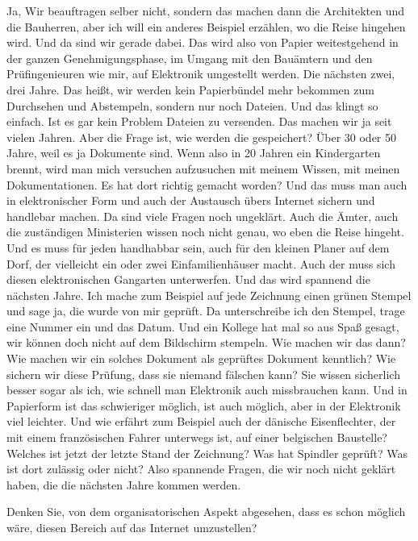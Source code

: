 \begin{description}
\Andre Ja, Wir beauftragen selber nicht, sondern das machen dann die Architekten und die Bauherren, aber ich will ein anderes Beispiel erzählen, wo die Reise hingehen wird. Und da sind wir gerade dabei. Das wird also von Papier weitestgehend in der ganzen Genehmigungsphase, im Umgang mit den Bauämtern und den Prüfingenieuren wie mir, auf Elektronik umgestellt werden. Die nächsten zwei, drei Jahre. Das heißt, wir werden kein Papierbündel mehr bekommen zum Durchsehen und Abstempeln, sondern nur noch Dateien. Und das klingt so einfach. Ist es gar kein Problem Dateien zu versenden. Das machen wir ja seit vielen Jahren. Aber die Frage ist, wie werden die gespeichert? Über 30 oder 50 Jahre, weil es ja Dokumente sind. Wenn also in 20 Jahren ein Kindergarten brennt, wird man mich versuchen aufzusuchen mit meinem Wissen, mit meinen Dokumentationen. Es hat dort richtig gemacht worden? Und das muss man auch in elektronischer Form und auch der Austausch übers Internet sichern und handlebar machen. Da sind viele Fragen noch ungeklärt. Auch die Ämter, auch die zuständigen Ministerien wissen noch nicht genau, wo eben die Reise hingeht. Und es muss für jeden handhabbar sein, auch für den kleinen Planer auf dem Dorf, der vielleicht ein oder zwei Einfamilienhäuser macht. Auch der muss sich diesen elektronischen Gangarten unterwerfen. Und das wird spannend die nächsten Jahre. Ich mache zum Beispiel auf jede Zeichnung einen grünen Stempel und sage ja, die wurde von mir geprüft. Da unterschreibe ich den Stempel, trage eine Nummer ein und das Datum. Und ein Kollege hat mal so aus Spaß gesagt, wir können doch nicht auf dem Bildschirm stempeln. Wie machen wir das dann? Wie machen wir ein solches Dokument als geprüftes Dokument kenntlich? Wie sichern wir diese Prüfung, dass sie niemand fälschen kann? Sie wissen sicherlich besser sogar als ich, wie schnell man Elektronik auch missbrauchen kann. Und in Papierform ist das schwieriger möglich, ist auch möglich, aber in der Elektronik viel leichter. Und wie erfährt zum Beispiel auch der dänische Eisenflechter, der mit einem französischen Fahrer unterwegs ist, auf einer belgischen Baustelle? Welches ist jetzt der letzte Stand der Zeichnung? Was hat Spindler geprüft? Was ist dort zulässig oder nicht? Also spannende Fragen, die wir noch nicht geklärt haben, die die nächsten Jahre kommen werden.

\Fabian Denken Sie, von dem organisatorischen Aspekt abgesehen, dass es schon möglich wäre, diesen Bereich auf das Internet umzustellen?


\end{description}
